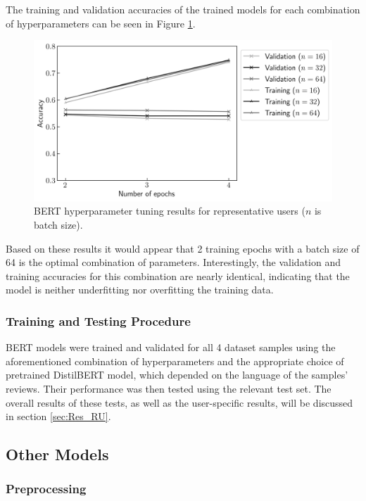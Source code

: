The training and validation accuracies of the trained models for each combination of hyperparameters can be seen in Figure \ref{fig:DI_PU_BERTHP}.

\begin{figure}[ht]
    \centering
    \includegraphics[scale=0.7]{figures/05_impl/02_pu/plot_hyperparams_bert.png}
    \caption{BERT hyperparameter tuning results for representative users ($n$ is batch size).}
    \label{fig:DI_PU_BERTHP}
\end{figure}

Based on these results it would appear that 2 training epochs with a batch size of 64 is the optimal combination of parameters. Interestingly, the validation and training accuracies for this combination are nearly identical, indicating that the model is neither underfitting nor overfitting the training data.

\subsubsection{Training and Testing Procedure}

BERT models were trained and validated for all 4 dataset samples using the aforementioned combination of hyperparameters and the appropriate choice of pretrained DistilBERT model, which depended on the language of the samples' reviews. Their performance was then tested using the relevant test set. The overall results of these tests, as well as the user-specific results, will be discussed in section \ref{sec:Res_RU}.

\subsection{Other Models}

\subsubsection{Preprocessing}

